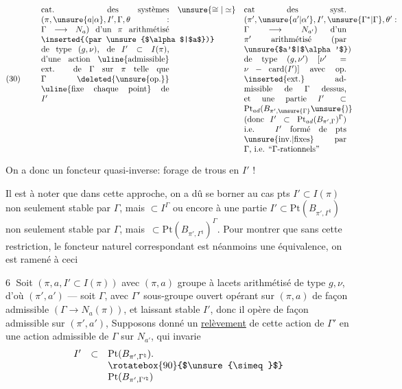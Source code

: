 \[
(30)\qquad
\begin{array}{c@{\quad}c@{\quad}c}
\parbox[t]{0.45\linewidth}{%
cat. des systèmes $(\pi,\unsure{a|\alpha},I',\Gamma,\theta:\Gamma\longrightarrow N_a)$
d'un $\pi$ arithmétisé \inserted{(par \unsure{$\alpha$|$a$})} de type $(g,\nu)$,
de $I'\subset I(\pi)$, d'une action
\uline{admissible} ext. de $\Gamma$ sur $\pi$
telle que $\Gamma$ \deleted{\unsure{op.}} \uline{fixe chaque point} de $I'$
}
& \unsure{\cong|\simeq} &
\parbox[t]{0.36\linewidth}{%
cat des syst.
$(\pi',\unsure{a'|\alpha'},I',\unsure{\Gamma^{*}|\Gamma},\theta':\Gamma\longrightarrow N_{a'})$
d'un $\pi'$ arithmétisé (par \unsure{$a'$|$\alpha'$}) de type
$(g,\nu')$ $[\nu'=\nu-\mathrm{card}(I')]$
avec op. \inserted{ext.} admissible de $\Gamma$ dessus, et
une partie $I'\subset\mathrm{Pt}_{ad}(B_{\pi',\unsure{\Gamma}}\unsure{)}$
(donc $I'\subset\mathrm{Pt}_{ad}(B_{\pi',\Gamma})^\Gamma$)
i.e. $I'$ formé de pts \unsure{inv.|fixes} par $\Gamma$, i.e. ``$\Gamma$-rationnels''
}
\end{array}
\]


On a donc un foncteur quasi-inverse:
forage de trous en $I'$ !

Il est à noter que dans cette approche, on a dû se borner au cas
  pts 
$I'\subset I(\pi)$ non seulement stable par $\Gamma$, mais
 $\subset I^\Gamma$
 ou encore à une partie
$I'\subset\mathrm{Pt}(B_{\pi',\Gamma^{\natural}})$
non seulement stable par $\Gamma$, mais
\,$\subset\mathrm{Pt}(B_{\pi',\Gamma^{\natural}})^\Gamma$.
Pour montrer que sans cette restriction, le foncteur naturel
 correspondant est néanmoins
une équivalence, on est ramené à ceci

\textcircled{6} Soit $(\pi,a,I'\subset I(\pi))$ avec $(\pi,a)$
groupe à lacets   arithmétisé de type
$g,\nu$, d'où $(\pi',a')$ --- soit $\Gamma$, avec $\Gamma'$
sous-groupe ouvert opérant sur $(\pi,a)$ de façon admissible
$(\Gamma\longrightarrow N_a(\pi))$,
et laissant stable $I'$, donc il opère de façon admissible sur
$(\pi',a')$,
Supposons donné un \uline{relèvement} de cette action de $\Gamma'$
en une action admissible de $\Gamma$ sur $N_{a'}$, qui invarie
\[
\begin{array}{rcl}
I'&\subset&\mathrm{Pt}(B_{\pi',\Gamma^{\natural}}).\\
&&\rotatebox{90}{$\unsure{\simeq}$}\\
&&\mathrm{Pt}(B_{\pi',\Gamma^{\prime\natural}})
\end{array}
\]

